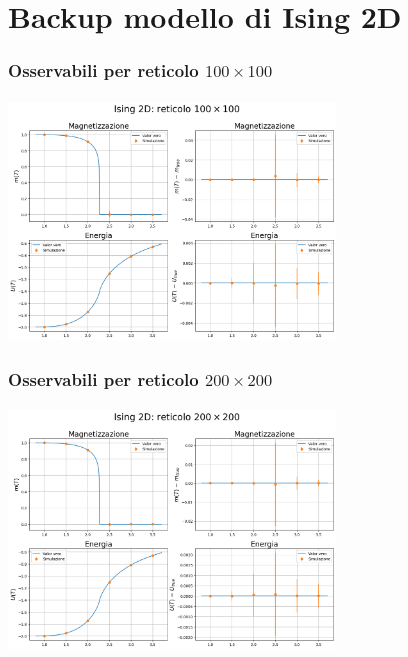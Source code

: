 \section{Backup modello di Ising 2D}

\begin{frame}
    \frametitle{Osservabili per reticolo $100 \times 100$}
    \framesubtitle{}

    \centering
    \includegraphics[width=0.65\textwidth]{Immagini/backupIsing2D/obs_100.png}

\end{frame}



\begin{frame}
    \frametitle{Osservabili per reticolo $200 \times 200$}
    \framesubtitle{}

    \centering
    \includegraphics[width=0.65\textwidth]{Immagini/backupIsing2D/obs_200.png}

\end{frame}



